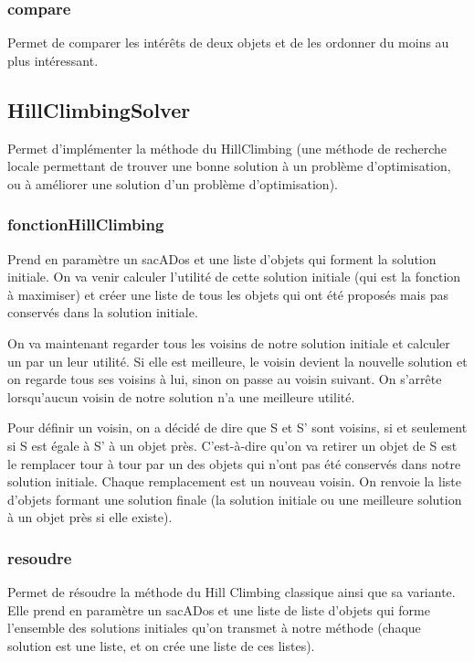 \documentclass[11pt]{article}
\begin{document}
\subsubsection{compare}
Permet de comparer les intérêts de deux objets et de les ordonner du moins au plus intéressant.

\subsection{HillClimbingSolver}
Permet d’implémenter la méthode du HillClimbing (une méthode de recherche locale permettant de trouver une bonne solution à un problème d’optimisation, ou à améliorer une solution d’un problème d’optimisation).

\subsubsection{fonctionHillClimbing}
Prend en paramètre un sacADos et une liste d’objets qui forment la solution initiale. On va venir calculer l’utilité de cette solution initiale (qui est la fonction à maximiser) et créer une liste de tous les objets qui ont été proposés mais pas conservés dans la solution initiale. 

On va maintenant regarder tous les voisins de notre solution initiale et calculer un par un leur utilité. Si elle est meilleure, le voisin devient la nouvelle solution et on regarde tous ses voisins à lui, sinon on passe au voisin suivant. On s’arrête lorsqu’aucun voisin de notre solution n’a une meilleure utilité. 

Pour définir un voisin, on a décidé de dire que S et S’ sont voisins, si et seulement si S est égale à S’ à un objet près. C'est-à-dire qu’on va retirer un objet de S est le remplacer tour à tour par un des objets qui n’ont pas été conservés dans notre solution initiale. Chaque remplacement est un nouveau voisin. On renvoie la liste d'objets formant une solution finale (la solution initiale ou une meilleure solution à un objet près si elle existe). 

\subsubsection{resoudre}
Permet de résoudre la méthode du Hill Climbing classique ainsi que sa variante. Elle prend en paramètre un sacADos et une liste de liste d’objets qui forme l’ensemble des solutions initiales qu’on transmet à notre méthode (chaque solution est une liste, et on crée une liste de ces listes). 
\end{document}
